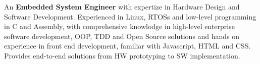 \nohyphens{\justify
An \textbf{Embedded System Engineer} with expertize in Hardware Design and Software Development. Experienced in Linux,
RTOSs and low-level programming in C and Assembly, with comprehensive knowlodge in high-level
enterprise software development, OOP, TDD and Open Source solutions and hands on experience in front end development,
familiar with Javascript, HTML and CSS. Provides end-to-end solutions from HW prototyping to SW implementation.
}
